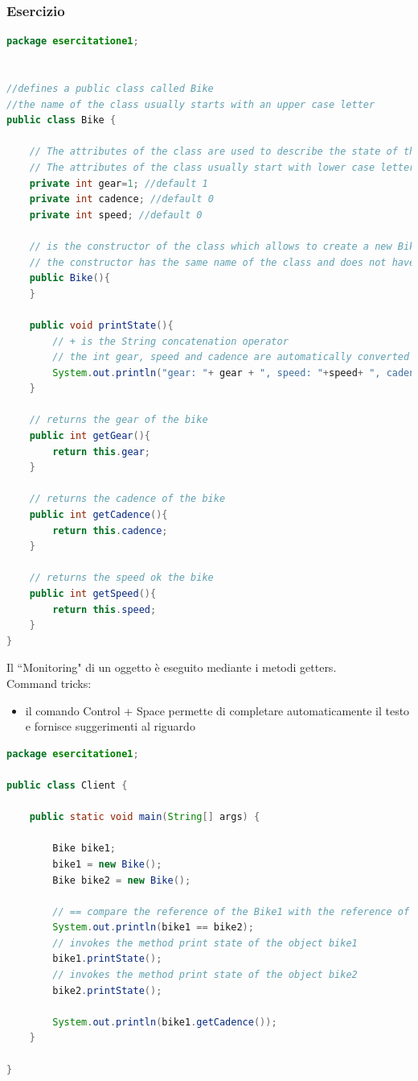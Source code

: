 \documentclass{article}
\theoremstyle{definition}
\begin{document}
\subsubsection{Esercizio}


\begin{lstlisting}[language=Java,escapechar=|]
package esercitatione1;


//defines a public class called Bike 
//the name of the class usually starts with an upper case letter
public class Bike {
	
	// The attributes of the class are used to describe the state of the class and are usually private or protected 
	// The attributes of the class usually start with lower case letters
	private int gear=1; //default 1
	private int cadence; //default 0
	private int speed; //default 0
	
	// is the constructor of the class which allows to create a new Bike
	// the constructor has the same name of the class and does not have a return type
	public Bike(){
	}
	
	public void printState(){
	    // + is the String concatenation operator
	    // the int gear, speed and cadence are automatically converted into String
		System.out.println("gear: "+ gear + ", speed: "+speed+ ", cadence: "+cadence);
	}
	
	// returns the gear of the bike
	public int getGear(){
		return this.gear;
	}

	// returns the cadence of the bike
	public int getCadence(){
		return this.cadence;
	}
	
	// returns the speed ok the bike
	public int getSpeed(){
		return this.speed;
	}
}
\end{lstlisting}

Il ``Monitoring" di un oggetto \`e eseguito mediante i metodi getters.\\
Command tricks:
\begin{itemize}
\item il comando Control + Space permette di completare automaticamente il testo e fornisce suggerimenti al riguardo
\end{itemize}


\begin{lstlisting}[language=Java,escapechar=|]
package esercitatione1;

public class Client {

	public static void main(String[] args) {

		Bike bike1;
		bike1 = new Bike();
		Bike bike2 = new Bike();

		// == compare the reference of the Bike1 with the reference of the Bike2
		System.out.println(bike1 == bike2);
		// invokes the method print state of the object bike1
		bike1.printState();
		// invokes the method print state of the object bike2
		bike2.printState();

		System.out.println(bike1.getCadence());
	}

}

\end{lstlisting}
\end{document}
